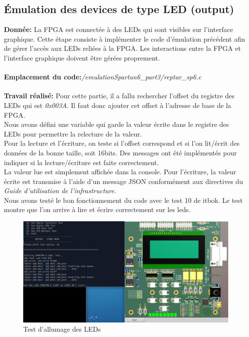 \subsection{Émulation des devices de type LED (output)}
\textbf{Donnée: }La FPGA est connectée à des LEDs qui sont visibles sur l'interface graphique. Cette étape consiste à
implémenter le code d'émulation précédent afin de gérer l'accès aux LEDs reliées à la FPGA.
Les interactions entre la FPGA et l'interface graphique doivent être gérées proprement. \\\\
\textbf{Emplacement du code:}\textit{/emulationSpartan6\_part3/reptar\_sp6.c}\\\\
\textbf{Travail réalisé: }Pour cette partie, il a fallu rechercher l'offset du registre des LEDs qui est \textit{0x003A}. Il faut donc ajouter cet offset à l'adresse de base de la FPGA.\\ Nous avons défini une variable qui garde la valeur écrite dans le registre des LEDs pour permettre la relecture de la valeur.\\ Pour la lecture et l'écriture, on teste si l'offset correspond et si l'on lit/écrit des données de la bonne taille, soit 16bits. Des messages ont été implémentés pour indiquer si la lecture/écriture est faite correctement.
\\La valeur lue est simplement affichée dans la console. Pour l'écriture, la valeur écrite est transmise à l'aide d'un message JSON conformément aux directives du \textit{Guide d'utilisation de l'infrastructure}.
\\Nous avons testé le bon fonctionnement du code avec le test 10 de itbok. Le test montre que l'on arrive à lire et écrire correctement sur les leds.
\begin{figure}[H]
	\begin{center}
		\includegraphics[width=16cm]{img/leds1.png}
		\caption{Test d'allumage des LEDs}
		\label{leds1}
	\end{center}
\end{figure}
